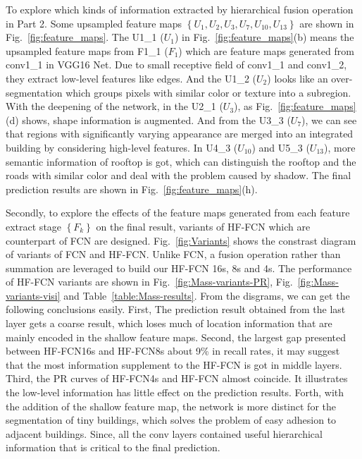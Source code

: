 To explore which kinds of information extracted by hierarchical fusion operation in Part 2.
Some upsampled feature maps ${\left\{U_1,U_2,U_3,U_7,U_{10},U_{13}\right\}}$ are shown in Fig.~\ref{fig:feature_maps}.
The U1\_1 (${U_1}$) in Fig.~\ref{fig:feature_maps}(b) means the upsampled feature maps from F1\_1 (${F_1}$) which are feature maps generated from conv1\_1 in VGG16 Net.
Due to small receptive field of conv1\_1 and conv1\_2, they extract low-level features like edges.
And the U1\_2 (${U_2}$) looks like an over-segmentation which groups pixels with similar color or texture into a subregion.
With the deepening of the network, in the U2\_1 (${U_3}$), as Fig.~\ref{fig:feature_maps}(d) shows, shape information is augmented.
And from the U3\_3 (${U_7}$), we can see that regions with significantly varying appearance are merged into an integrated building by considering high-level features.
In U4\_3 (${U_{10}}$) and U5\_3 ($U_{13}$), more semantic information of rooftop is got, which can distinguish the rooftop and the roads with similar color and deal with the problem caused by shadow.
The final prediction results are shown in Fig.~\ref{fig:feature_maps}(h).

Secondly, to explore the effects of the feature maps generated from each feature extract stage ${\left\{F_k\right\}}$ on the final result, variants of HF-FCN which are counterpart of FCN are designed.
Fig.~\ref{fig:Variants} shows the constrast diagram of variants of FCN and HF-FCN.
Unlike FCN, a fusion operation rather than summation are leveraged to build our HF-FCN 16s, 8s and 4s.
The performance of HF-FCN variants are shown in Fig.~\ref{fig:Mass-variants-PR}, Fig.~\ref{fig:Mass-variants-visi} and Table~\ref{table:Mass-results}.
From the disgrams, we can get the following conclusions easily. First, The prediction result obtained from the last layer gets a coarse result, which loses much of location information that are mainly encoded in the shallow feature maps. Second, the largest gap presented between HF-FCN16s and HF-FCN8s about 9{\%} in recall rates, it may suggest that the most information supplement to the HF-FCN is got in middle layers. Third, the PR curves of HF-FCN4s and HF-FCN almost coincide. It illustrates the low-level information has little effect on the prediction results. Forth, with the addition of the shallow feature map, the network is more distinct for the segmentation of tiny buildings, which solves the problem of easy adhesion to adjacent buildings. Since, all the conv layers contained useful hierarchical information that is critical to the final prediction.

